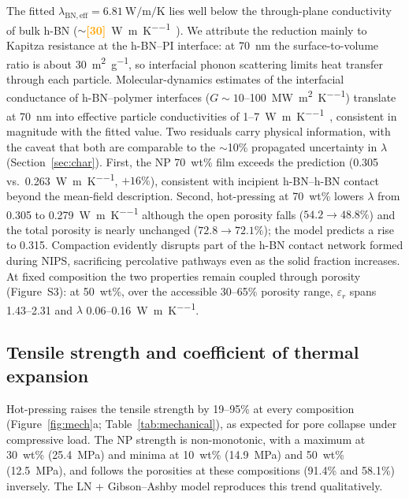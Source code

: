 \documentclass[preprint,a4paper]{elsarticle}
\newcommand{\eps}{\ensuremath{\varepsilon_r}}   %
\newcommand{\lam}{\ensuremath{\lambda}}
\newcommand{\lamBN}{\ensuremath{\lambda_{\mathrm{BN,eff}}}}
\newcommand{\hl}[1]{\textcolor{orange}{\textbf{[#1]}}}
\begin{document}
The fitted $\lamBN = \SI{6.81}{\watt\per\meter\per\kelvin}$ lies well below the through-plane conductivity of bulk h-BN ($\sim$\hl{30}~\si{\watt\per\meter\per\kelvin}~\cite{guerra2019thermal}). We attribute the reduction mainly to Kapitza resistance at the h-BN--PI interface: at \SI{70}{\nm} the surface-to-volume ratio is about \SI{30}{\meter\squared\per\gram}, so interfacial phonon scattering limits heat transfer through each particle. Molecular-dynamics estimates of the interfacial conductance of h-BN--polymer interfaces ($G \sim 10$--\SI{100}{\mega\watt\per\meter\squared\per\kelvin}) translate at \SI{70}{\nm} into effective particle conductivities of 1--\SI{7}{\watt\per\meter\per\kelvin}~\cite{gu2021breaking}, consistent in magnitude with the fitted value. Two residuals carry physical information, with the caveat that both are comparable to the $\sim$10\% propagated uncertainty in \lam{} (Section~\ref{sec:char}). First, the NP 70~wt\% film exceeds the prediction (0.305 vs.\ \SI{0.263}{\watt\per\meter\per\kelvin}, $+16\%$), consistent with incipient h-BN--h-BN contact beyond the mean-field description. Second, hot-pressing at 70~wt\% lowers \lam{} from 0.305 to \SI{0.279}{\watt\per\meter\per\kelvin} although the open porosity falls ($54.2 \to 48.8\%$) and the total porosity is nearly unchanged ($72.8 \to 72.1\%$); the model predicts a rise to 0.315. Compaction evidently disrupts part of the h-BN contact network formed during NIPS, sacrificing percolative pathways even as the solid fraction increases. At fixed composition the two properties remain coupled through porosity (Figure~S3): at 50~wt\%, over the accessible 30--65\% porosity range, \eps{} spans 1.43--2.31 and \lam{} 0.06--\SI{0.16}{\watt\per\meter\per\kelvin}.

\subsection{Tensile strength and coefficient of thermal expansion}
\label{sec:mechanical}
Hot-pressing raises the tensile strength by 19--95\% at every composition (Figure~\ref{fig:mech}a; Table~\ref{tab:mechanical}), as expected for pore collapse under compressive load. The NP strength is non-monotonic, with a maximum at 30~wt\% (\SI{25.4}{\mega\pascal}) and minima at 10~wt\% (\SI{14.9}{\mega\pascal}) and 50~wt\% (\SI{12.5}{\mega\pascal}), and follows the porosities at these compositions (91.4\% and 58.1\%) inversely. The LN + Gibson--Ashby model reproduces this trend qualitatively.
\end{document}
